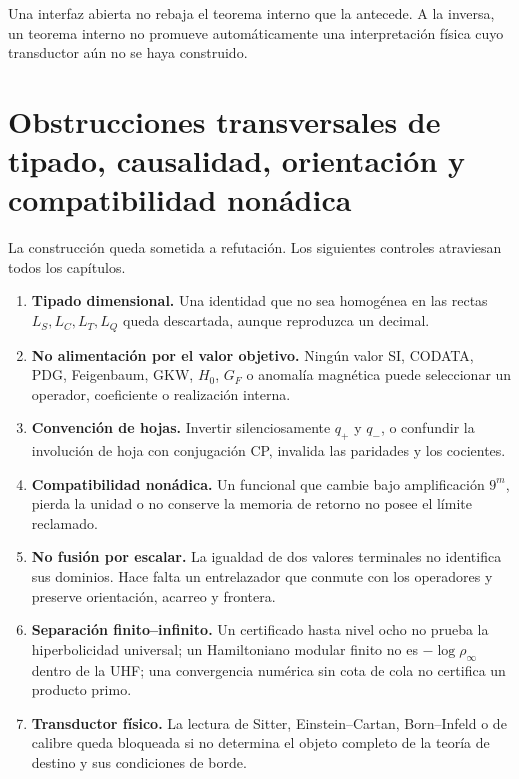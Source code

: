 Una interfaz abierta no rebaja el teorema interno que la antecede. A la
inversa, un teorema interno no promueve autom\'aticamente una interpretaci\'on
f\'isica cuyo transductor a\'un no se haya construido.

\section{Obstrucciones transversales de tipado, causalidad, orientación y compatibilidad nonádica}

La construcción queda sometida a refutaci\'on. Los siguientes
controles atraviesan todos los cap\'itulos.

\begin{enumerate}[label=F\arabic*.]
\item \textbf{Tipado dimensional.} Una identidad que no sea homog\'enea en las
rectas \(L_S,L_C,L_T,L_Q\) queda descartada, aunque reproduzca un decimal.

\item \textbf{No alimentaci\'on por el valor objetivo.} Ning\'un valor SI, CODATA, PDG,
Feigenbaum, GKW, \(H_0\), \(G_F\) o anomal\'ia magn\'etica puede seleccionar
un operador, coeficiente o realizaci\'on interna.

\item \textbf{Convenci\'on de hojas.} Invertir silenciosamente \(q_+\) y
\(q_-\), o confundir la involuci\'on de hoja con conjugaci\'on CP, invalida las
paridades y los cocientes.

\item \textbf{Compatibilidad non\'adica.} Un funcional que cambie bajo
amplificaci\'on \(9^m\), pierda la unidad o no conserve la memoria de retorno
no posee el l\'imite reclamado.

\item \textbf{No fusi\'on por escalar.} La igualdad de dos valores terminales
no identifica sus dominios. Hace falta un entrelazador que conmute con los
operadores y preserve orientaci\'on, acarreo y frontera.

\item \textbf{Separaci\'on finito--infinito.} Un certificado hasta nivel ocho
no prueba la hiperbolicidad universal; un Hamiltoniano modular finito no es
\(-\log\rho_\infty\) dentro de la UHF; una convergencia num\'erica sin cota de
cola no certifica un producto primo.

\item \textbf{Transductor f\'isico.} La lectura de Sitter, Einstein--Cartan,
Born--Infeld o de calibre queda bloqueada si no determina el objeto completo de la
teor\'ia de destino y sus condiciones de borde.
\end{enumerate}

